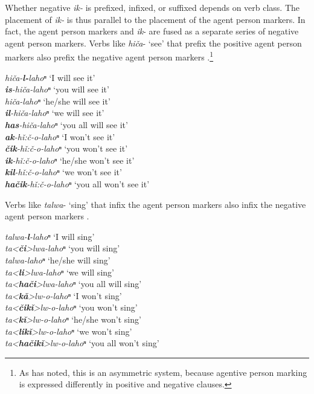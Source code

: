 \documentclass[output=paper,colorlinks,citecolor=brown]{langscibook}
\begin{document}
Whether negative \textit{ik-} is prefixed, infixed, or suffixed depends on verb class. The placement of \textit{ik-} is thus parallel to the placement of the agent person markers. In fact, the agent person markers and \textit{ik}- are fused as a separate series of negative agent person markers. Verbs like \textit{hiča}- ‘see’ that prefix the positive agent person markers also prefix the negative agent person markers .\footnote{As \citet[129]{Miestamo2005} has noted, this is an asymmetric system, because agentive person marking is expressed differently in positive and negative clauses.} 

\ea
\label{ex:koa:11}
    \textit{hiča-\textbf{l-}lahoⁿ} \tab ‘I will see it’ \\
    \textit{\textbf{is}-hiča-lahoⁿ} \tab ‘you will see it’ \\
    \textit{hiča-lahoⁿ} \tab ‘he/she will see it’ \\
    \textit{\textbf{il}-hiča-lahoⁿ} \tab ‘we will see it’ \\
    \textit{\textbf{has}-hiča-lahoⁿ} \tab ‘you all will see it’ \\
\vspace{2mm}
    \textit{\textbf{ak}-hǐ:č-o-lahoⁿ} \tab ‘I won’t see it’ \\
    \textit{\textbf{čik}-hǐ:č-o-lahoⁿ} \tab ‘you won’t see it’ \\
    \textit{\textbf{ik}-hǐ:č-o-lahoⁿ} \tab ‘he/she won’t see it’ \\
    \textit{\textbf{kil}-hǐ:č-o-lahoⁿ} \tab ‘we won’t see it’ \\
    \textit{\textbf{hačik}-hǐ:č-o-lahoⁿ} \tab ‘you all won’t see it’ \\
\z 


Verbs like \textit{talwa}- ‘sing’ that infix the agent person markers also infix the negative agent person markers .

\ea
\label{ex:koa:12}
    \textit{talwa-\textbf{l}-lahoⁿ} \tab ‘I will sing’ \\
    \textit{ta<\textbf{či}>lwa-lahoⁿ} \tab ‘you will sing’ \\
    \textit{talwa-lahoⁿ} \tab ‘he/she will sing’ \\
    \textit{ta<\textbf{li}>lwa-lahoⁿ} \tab ‘we will sing’ \\
    \textit{ta<\textbf{hači}>lwa-lahoⁿ} \tab ‘you all will sing’ \\
\vspace{2mm}
    \textit{ta<\textbf{kǎ}>lw-o-lahoⁿ} \tab ‘I won’t sing’ \\
    \textit{ta<\textbf{čikǐ}>lw-o-lahoⁿ} \tab ‘you won’t sing’ \\
    \textit{ta<\textbf{kǐ}>lw-o-lahoⁿ} \tab ‘he/she won’t sing’ \\
    \textit{ta<\textbf{likǐ}>lw-o-lahoⁿ} \tab ‘we won’t sing’ \\
    \textit{ta<\textbf{hačikǐ}>lw-o-lahoⁿ} \tab ‘you all won’t sing’ \\
\z
\end{document}
